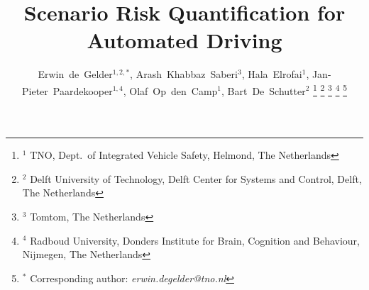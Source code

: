 \documentclass[journal]{IEEEtran}
\begin{document}
\date{}

\title{Scenario Risk Quantification for Automated Driving}

\author{Erwin~de~Gelder$^{1,2,*}$,
	    Arash~Khabbaz~Saberi$^{3}$,
	    Hala~Elrofai$^{1}$,
	    Jan-Pieter~Paardekooper$^{1,4}$,
	    Olaf~Op~den~Camp$^{1}$,
	    Bart~De~Schutter$^{2}$%
\thanks{$^1$ TNO, Dept.\ of Integrated Vehicle Safety, Helmond, The Netherlands}%
\thanks{$^2$ Delft University of Technology, Delft Center for Systems and Control, Delft, The Netherlands}%
\thanks{$^3$ Tomtom, The Netherlands}%
\thanks{$^4$ Radboud University, Donders Institute for Brain, Cognition and Behaviour, Nijmegen, The Netherlands}%
\thanks{$^*$ Corresponding author: \textit{erwin.degelder@tno.nl}}}%

\maketitle

\acresetall









\printbibliography
\end{document}
